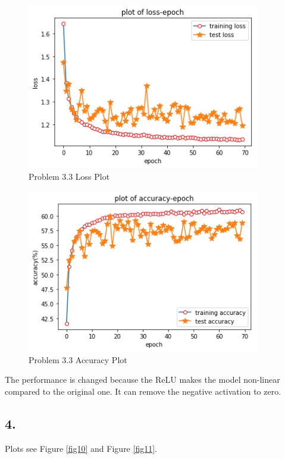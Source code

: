 \documentclass[twoside,12pt]{homework}
\begin{document}
\begin{figure}[!htb]
\begin{center}
\includegraphics[width=4in]{Unknown-5.png}
\caption{Problem 3.3 Loss Plot}
\label{fig8}
\end{center}
\end{figure}

\begin{figure}[!htb]
\begin{center}
\includegraphics[width=4in]{Unknown-6.png}
\caption{Problem 3.3 Accuracy Plot}
\label{fig9}
\end{center}
\end{figure}

\noindent The performance is changed because the ReLU makes the model non-linear compared to the original one. It can remove the negative activation to zero.

\subsection*{4.}

Plots see Figure \ref{fig10} and Figure \ref{fig11}.
\end{document}
